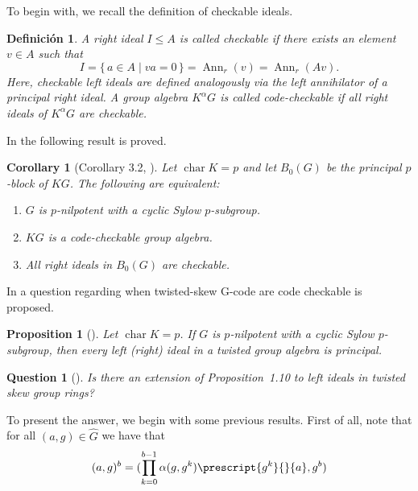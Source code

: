 \documentclass{article}
\newtheorem{proposition}[theorem]{Proposition}
\newtheorem{corollary}[theorem]{Corollary}
\newtheorem{definition}{Definición}
\newtheorem{question}{Question}
\begin{document}
To begin with, we recall the definition of checkable ideals.
\begin{definition}
A right ideal $I \le A$ is called checkable if there exists an element $v \in A$
such that
\[
I = \{\, a \in A \mid va = 0 \,\}
    = \operatorname{Ann}_r(v)
    = \operatorname{Ann}_r(Av).
\]
Here, checkable left ideals are defined analogously via the left annihilator of a principal
right ideal. A group algebra $K^\alpha G$ is called code-checkable if all right ideals of
$K^\alpha G$ are checkable. 
\end{definition}

In \cite{BorelloDeLaCruzWillems2022} the following result is proved.

\begin{corollary}[Corollary 3.2, \cite{BorelloDeLaCruzWillems2022}]
Let $\operatorname{char} K = p$ and let $B_0(G)$ be the principal $p$-block of $KG$. The following are equivalent:
\begin{enumerate}
    \item $G$ is $p$-nilpotent with a cyclic Sylow $p$-subgroup.
    \item $KG$ is a code-checkable group algebra.
    \item All right ideals in $B_0(G)$ are checkable.
\end{enumerate}
\end{corollary}

In \cite{Behajaina2024Twisted} a question regarding when twisted-skew G-code are code checkable is proposed.
\begin{proposition}[{\cite[Proposition~1.10]{Behajaina2024Twisted}}]
Let $\operatorname{char} K = p$. If $G$ is $p$-nilpotent with a cyclic Sylow $p$-subgroup,
then every left (right) ideal in a twisted group algebra is principal.
\end{proposition}

\begin{question}[{\cite[Question~1.11]{Behajaina2024Twisted}}]
Is there an extension of Proposition~1.10 to left ideals in twisted skew group rings?
\end{question}

To present the answer, we begin with some previous results. First of all, note that for all $(a,g) \in \hat{G}$ we have that
\begin{equation}
    (a,g) ^b = ( \prod_{k=0}^{b-1} \alpha(g,g^k)\prescript{g^k}{}{a}, g^b)
\end{equation}
\end{document}
